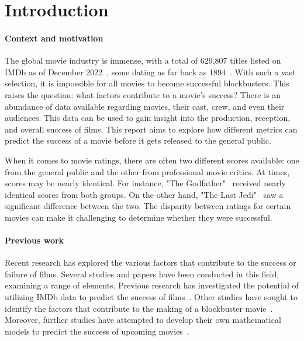 \section{Introduction}
    \begin{multicols}{2}
        \paragraph{Context and motivation}
            The global movie industry is immense, with a total of 629,807 titles listed on
                IMDb as of December 2022~\cite{imdbStats}, some dating as far back as
                1894~\cite{imdbOldest}.
            With such a vast selection, it is impossible for all movies to become
                successful blockbusters.
            This raises the question: what factors contribute to a movie's success?
            There is an abundance of data available regarding movies, their cast, crew, and
                even their audiences.
            This data can be used to gain insight into the production, reception, and
                overall success of films.
            This report aims to explore how different metrics can predict the success of a
                movie before it gets released to the general public.

            When it comes to movie ratings, there are often two different scores available:
                one from the general public and the other from professional movie critics.
            At times, scores may be nearly identical.
            For instance, "The Godfather"~\cite{rottenTomatoesGodfather} received nearly
                identical scores from both groups.
            On the other hand, "The Last Jedi"~\cite{rottenTomatoesLastJedi} saw a
                significant difference between the two.
            The disparity between ratings for certain movies can make it challenging to
                determine whether they were successful.

        \paragraph{Previous work}
            Recent research has explored the various factors that contribute to the success
                or failure of films.
            Several studies and papers have been conducted in this field, examining a range
                of elements.
            Previous research has investigated the potential of utilizing IMDb data to
                predict the success of films~\cite{dhirRaj}.
            Other studies have sought to identify the factors that contribute to the making
                of a blockbuster movie~\cite{collinsHandSnell}.
            Moreover, further studies have attempted to develop their own mathematical
                models to predict the success of upcoming
                movies~\cite{ahmadDuraisamyYousefBuckles}.


\end{multicols}
